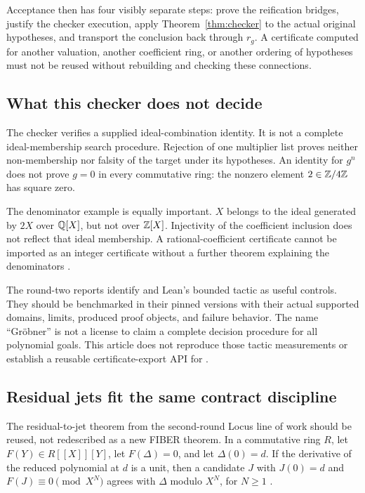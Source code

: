 \documentclass[11pt,letterpaper]{article}
\theoremstyle{definition}\newtheorem{definition}[theorem]{Definition}
\newcommand{\code}[1]{\texttt{\detokenize{#1}}}
\begin{document}
Acceptance then has four visibly separate steps: prove the reification bridges, justify the checker execution, apply Theorem~\ref{thm:checker} to the actual original hypotheses, and transport the conclusion back through $r_g$. A certificate computed for another valuation, another coefficient ring, or another ordering of hypotheses must not be reused without rebuilding and checking these connections.

\subsection{What this checker does not decide}
The checker verifies a supplied ideal-combination identity. It is not a complete ideal-membership search procedure. Rejection of one multiplier list proves neither non-membership nor falsity of the target under its hypotheses. An identity for $g^n$ does not prove $g=0$ in every commutative ring: the nonzero element $2\in\mathbb Z/4\mathbb Z$ has square zero.

The denominator example is equally important. $X$ belongs to the ideal generated by $2X$ over $\mathbb Q[X]$, but not over $\mathbb Z[X]$. Injectivity of the coefficient inclusion does not reflect that ideal membership. A rational-coefficient certificate cannot be imported as an integer certificate without a further theorem explaining the denominators \cite{reportA,reportB}.

The round-two reports identify \code{linear_combination} and Lean's bounded \code{grobner} tactic as useful controls. They should be benchmarked in their pinned versions with their actual supported domains, limits, produced proof objects, and failure behavior. The name ``Gr\"obner'' is not a license to claim a complete decision procedure for all polynomial goals. This article does not reproduce those tactic measurements or establish a reusable certificate-export API for \code{grobner}.

\subsection{Residual jets fit the same contract discipline}
The residual-to-jet theorem from the second-round Locus line of work should be reused, not redescribed as a new FIBER theorem. In a commutative ring $R$, let $F(Y)\in R[[X]][Y]$, let $F(\Delta)=0$, and let $\Delta(0)=d$. If the derivative of the reduced polynomial at $d$ is a unit, then a candidate $J$ with $J(0)=d$ and $F(J)\equiv0\pmod{X^N}$ agrees with $\Delta$ modulo $X^N$, for $N\ge1$ \cite{reportA,reportB}.
\end{document}
